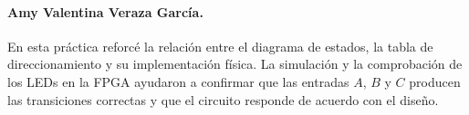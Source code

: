 \documentclass[letterpaper,12pt]{article}
\begin{document}
\paragraph{Amy Valentina Veraza García.} En esta práctica reforcé la relación entre el diagrama de estados, la tabla de direccionamiento y su implementación física. La simulación y la comprobación de los LEDs en la FPGA ayudaron a confirmar que las entradas $A$, $B$ y $C$ producen las transiciones correctas y que el circuito responde de acuerdo con el diseño.
\end{document}
